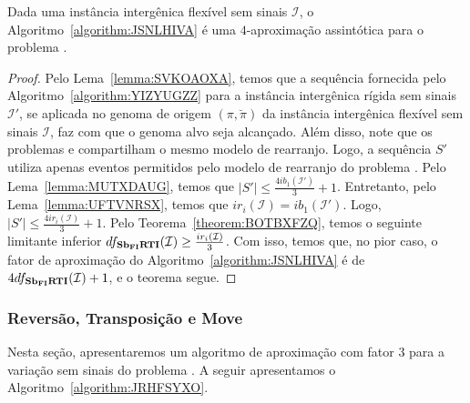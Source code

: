 \begin{theorem}\label{theorem:BBTWMULM}
Dada uma instância intergênica flexível sem sinais $\mathcal{I}$, o Algoritmo~\ref{algorithm:JSNLHIVA} é uma $4$-aproximação assintótica para o problema \SbFIRTI{}.
\end{theorem}
\begin{proof}
Pelo Lema~\ref{lemma:SVKOAOXA}, temos que a sequência fornecida pelo Algoritmo~\ref{algorithm:YIZYUGZZ} para a instância intergênica rígida sem sinais $\mathcal{I'}$, se aplicada no genoma de origem $(\pi,\breve\pi)$ da instância intergênica flexível sem sinais $\mathcal{I}$, faz com que o genoma alvo seja alcançado. Além disso, note que os problemas \SbIRTI{} e \SbFIRTI{} compartilham o mesmo modelo de rearranjo. Logo, a sequência $S'$ utiliza apenas eventos permitidos pelo modelo de rearranjo do problema \SbFIRTI{}. Pelo Lema~\ref{lemma:MUTXDAUG}, temos que $|S'| \le \frac{4ib_1(\mathcal{I}')}{3} + 1$. Entretanto, pelo Lema~\ref{lemma:UFTVNRSX}, temos que $ir_i(\mathcal{I}) = ib_1(\mathcal{I'})$. Logo, $|S'| \le \frac{4ir_i(\mathcal{I})}{3} + 1$. Pelo Teorema~\ref{theorem:BOTBXFZQ}, temos o seguinte limitante inferior $df_{\textbf{Sb\textsubscript{FI}RTI}}(\mathcal{I}) \ge \frac{ir_i(\mathcal{I})}{3}$. Com isso, temos que, no pior caso, o fator de aproximação do Algoritmo~\ref{algorithm:JSNLHIVA} é de $4df_{\textbf{Sb\textsubscript{FI}RTI}}(\mathcal{I}) + 1$, e o teorema segue.
\end{proof}

\subsubsection{Reversão, Transposição e Move}

Nesta seção, apresentaremos um algoritmo de aproximação com fator $3$ para a variação sem sinais do problema \SbFIRTM{}. A seguir apresentamos o Algoritmo~\ref{algorithm:JRHFSYXO}.



